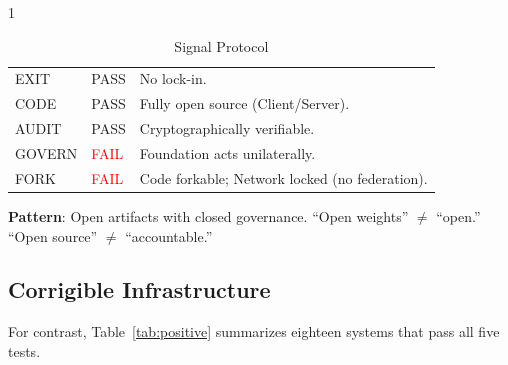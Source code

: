 \begin{table}[htbp]
    \begin{subtable}{1\textwidth}
        \centering
        \caption{Signal Protocol}
        \small
        \begin{tabular}{@{}llp{8.5cm}@{}}
            \toprule
            EXIT & \textcolor{green!50!black}{PASS} & No lock-in. \\
            CODE & \textcolor{green!50!black}{PASS} & Fully open source (Client/Server). \\
            AUDIT & \textcolor{green!50!black}{PASS} & Cryptographically verifiable. \\
            GOVERN & \textcolor{red}{FAIL} & Foundation acts unilaterally. \\
            FORK & \textcolor{red}{FAIL} & Code forkable; Network locked (no federation). \\
            \bottomrule
        \end{tabular}
    \end{subtable}
\end{table}

\textbf{Pattern}: Open artifacts with closed governance. ``Open weights'' $\neq$ ``open.'' ``Open source'' $\neq$ ``accountable.''

\subsection{Corrigible Infrastructure}

For contrast, Table~\ref{tab:positive} summarizes eighteen systems that pass all five tests.

